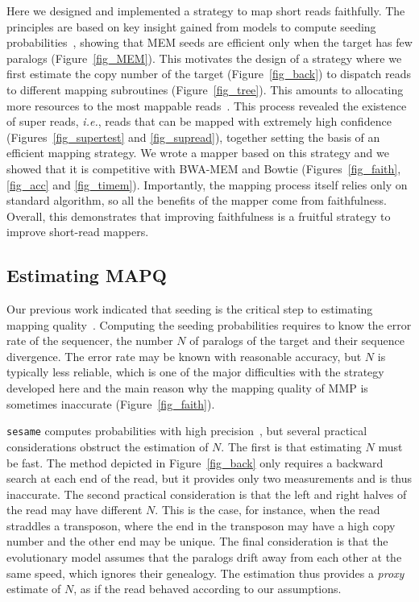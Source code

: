 \documentclass[a4,center,fleqn]{NAR}
\begin{document}
Here we designed and implemented a strategy to map short reads faithfully.
The principles are based on key insight gained from models to compute
seeding probabilities~\cite{Filion619155}, showing that MEM seeds are
efficient only when the target has few paralogs (Figure~\ref{fig_MEM}).
This motivates the design of a strategy where we first estimate the copy
number of the target (Figure~\ref{fig_back}) to dispatch reads to
different mapping subroutines (Figure~\ref{fig_tree}). This amounts to
allocating more resources to the most mappable reads~\cite{pmid22276185}.
This process revealed the existence of super reads, \textit{i.e.}, reads
that can be mapped with extremely high confidence
(Figures~\ref{fig_supertest} and \ref{fig_supread}), together setting the
basis of an efficient mapping strategy. We wrote a mapper based on this
strategy and we showed that it is competitive with BWA-MEM and Bowtie
(Figures~\ref{fig_faith}, \ref{fig_acc} and \ref{fig_timem}). Importantly,
the mapping process itself relies only on standard algorithm, so all the
benefits of the mapper come from faithfulness. Overall, this demonstrates
that improving faithfulness is a fruitful strategy to improve short-read
mappers.


\subsection{Estimating MAPQ}

Our previous work indicated that seeding is the critical step to
estimating mapping quality~\cite{Filion619155}. Computing the seeding
probabilities requires to know the error rate of the sequencer, the number
$N$ of paralogs of the target and their sequence divergence. The error
rate may be known with reasonable accuracy, but $N$ is typically less
reliable, which is one of the major difficulties with the strategy
developed here and the main reason why the mapping quality of MMP is
sometimes inaccurate (Figure~\ref{fig_faith}).

\texttt{sesame} computes probabilities with high
precision~\cite{Filion619155}, but several practical considerations
obstruct the estimation of $N$. The first is that estimating $N$ must be
fast. The method depicted in Figure~\ref{fig_back} only requires a
backward search at each end of the read, but it provides only two
measurements and is thus inaccurate. The second practical consideration is
that the left and right halves of the read may have different $N$. This is
the case, for instance, when the read straddles a transposon, where the
end in the transposon may have a high copy number and the other end may be
unique. The final consideration is that the evolutionary model assumes
that the paralogs drift away from each other at the same speed, which
ignores their genealogy. The estimation thus provides a \emph{proxy}
estimate of $N$, as if the read behaved according to our assumptions.
\end{document}
